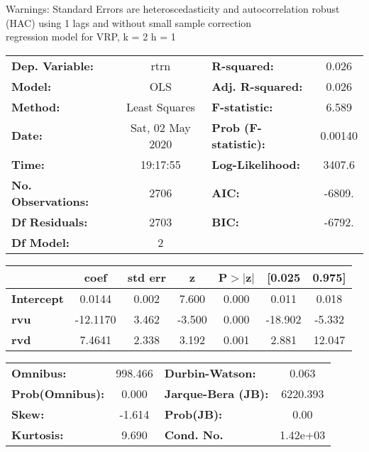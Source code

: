 Warnings: \newline
 [1] Standard Errors are heteroscedasticity and autocorrelation robust (HAC) using 1 lags and without small sample correction\\ 

regression model for VRP, k = 2 h = 1\begin{center}
\begin{tabular}{lclc}
\toprule
\textbf{Dep. Variable:}    &       rtrn       & \textbf{  R-squared:         } &     0.026   \\
\textbf{Model:}            &       OLS        & \textbf{  Adj. R-squared:    } &     0.026   \\
\textbf{Method:}           &  Least Squares   & \textbf{  F-statistic:       } &     6.589   \\
\textbf{Date:}             & Sat, 02 May 2020 & \textbf{  Prob (F-statistic):} &  0.00140    \\
\textbf{Time:}             &     19:17:55     & \textbf{  Log-Likelihood:    } &    3407.6   \\
\textbf{No. Observations:} &        2706      & \textbf{  AIC:               } &    -6809.   \\
\textbf{Df Residuals:}     &        2703      & \textbf{  BIC:               } &    -6792.   \\
\textbf{Df Model:}         &           2      & \textbf{                     } &             \\
\bottomrule
\end{tabular}
\begin{tabular}{lcccccc}
                   & \textbf{coef} & \textbf{std err} & \textbf{z} & \textbf{P$> |$z$|$} & \textbf{[0.025} & \textbf{0.975]}  \\
\midrule
\textbf{Intercept} &       0.0144  &        0.002     &     7.600  &         0.000        &        0.011    &        0.018     \\
\textbf{rvu}       &     -12.1170  &        3.462     &    -3.500  &         0.000        &      -18.902    &       -5.332     \\
\textbf{rvd}       &       7.4641  &        2.338     &     3.192  &         0.001        &        2.881    &       12.047     \\
\bottomrule
\end{tabular}
\begin{tabular}{lclc}
\textbf{Omnibus:}       & 998.466 & \textbf{  Durbin-Watson:     } &    0.063  \\
\textbf{Prob(Omnibus):} &   0.000 & \textbf{  Jarque-Bera (JB):  } & 6220.393  \\
\textbf{Skew:}          &  -1.614 & \textbf{  Prob(JB):          } &     0.00  \\
\textbf{Kurtosis:}      &   9.690 & \textbf{  Cond. No.          } & 1.42e+03  \\
\bottomrule
\end{tabular}
\end{center}

